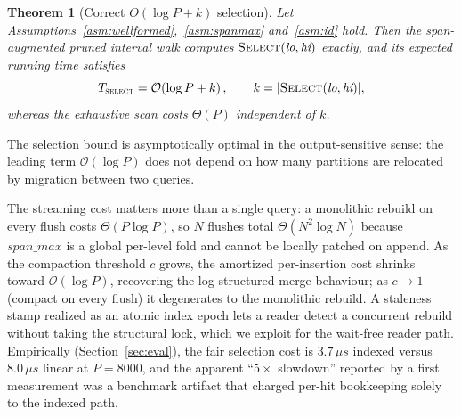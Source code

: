 \documentclass{article}
\newtheorem{theorem}{Theorem}
\begin{document}
\begin{theorem}[Correct $O(\log P + k)$ selection]
\label{thm:select}
Let Assumptions~\ref{asm:wellformed},~\ref{asm:spanmax} and~\ref{asm:id} hold. Then the
span-augmented pruned interval walk computes $\textsc{Select}(\textit{lo}, \textit{hi})$
exactly, and its expected running time satisfies
\begin{equation}
T_{\textsc{select}} = \mathcal{O}\!\left(\log P + k\right), \qquad k = |\textsc{Select}(\textit{lo}, \textit{hi})|,
\end{equation}
whereas the exhaustive scan costs $\Theta(P)$ independent of $k$.
\end{theorem}

The selection bound is asymptotically optimal in the output-sensitive sense: the
leading term $\mathcal{O}(\log P)$ does not depend on how many partitions are
relocated by migration between two queries.

The streaming cost matters more than a single query: a monolithic rebuild on every
flush costs $\Theta(P \log P)$, so $N$ flushes total $\Theta(N^2 \log N)$ because
$\textit{span\_max}$ is a global per-level fold and cannot be locally patched on
append. As the compaction threshold $c$ grows, the amortized per-insertion cost
shrinks toward $\mathcal{O}(\log P)$, recovering the log-structured-merge behaviour;
as $c \to 1$ (compact on every flush) it degenerates to the monolithic rebuild.
A staleness stamp realized as an atomic index epoch lets a reader detect a concurrent
rebuild without taking the structural lock, which we exploit for the wait-free reader
path. Empirically (Section~\ref{sec:eval}), the fair selection cost is
$3.7\,\mu s$ indexed versus $8.0\,\mu s$ linear at $P = 8000$, and the apparent
``$5\times$ slowdown'' reported by a first measurement was a benchmark artifact that
charged per-hit bookkeeping solely to the indexed path.

\end{document}
